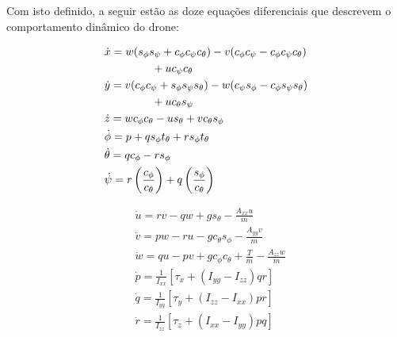 Com isto definido, a seguir estão as doze equações diferenciais que descrevem o comportamento dinâmico do drone:

\vspace{-0.2cm}

\begin{minipage}{0.5\textwidth}
    \begin{equation*}
        \begin{aligned}
            &\dot{{x}} = {w}({s_{\phi}s_{\psi}} + {c_{\phi}c_{\psi}c_{\theta}}) - {v}({c_{\phi}c_{\psi}} - {c_{\phi}c_{\psi}c_{\theta}}) \\
            &\hspace{1.5cm} + {uc_{\psi}c_{\theta}}\\
            &\dot{{y}} = {v}({c_{\phi}c_{\psi}} + {s_{\phi}s_{\psi}s_{\theta}}) - {w}({c_{\psi}s_{\phi}} - {c_{\phi}s_{\psi}s_{\theta}}) \\
            &\hspace{1.5cm} + {uc_{\theta}s_{\psi}}\\
            &\dot{{z}} = {wc_{\phi}c_{\theta}} - {us_{\theta}} + {vc_{\theta}s_{\phi}}\\
            &\dot{{\phi}} = {p} + {qs_{\phi}t_{\theta}} + {rs_{\phi}t_{\theta}}\\
            &\dot{{\theta}} = {qc_{\phi}} - {rs_{\phi}}\\
            &\dot{{\psi}} = {r\left(\frac{c_{\phi}}{c_{\theta}}\right)} + {q\left(\frac{s_{\phi}}{c_{\theta}}\right)}
        \end{aligned}
    \end{equation*}
\end{minipage}
\hfill
\begin{minipage}{0.45\textwidth}
    \begin{equation*}
        \begin{aligned}
            &\dot{{u}} = {rv} - {qw} + {gs_{\theta}} - \frac{{A_{xx}}{u}}{{m}}\\
            &\dot{{v}} = {pw} - {ru} - {gc_{\theta}s_{\phi}} - \frac{{A_{yy}}{v}}{{m}}\\
            &\dot{{w}} = {qu} - {pv} + {gc_{\phi}c_{\theta}} + {\frac{T}{m}} - \frac{{A_{zz}}{w}}{{m}}\\
            &\dot{{p}} = {\frac{1}{I_{xx}}\left[{\tau_x + (I_{yy} - I_{zz})qr}\right]}\\
            &\dot{{q}} = {\frac{1}{I_{yy}}\left[{\tau_y + (I_{zz} - I_{xx})pr}\right]}\\
            &\dot{{r}} = {\frac{1}{I_{zz}}\left[{\tau_z + (I_{xx} - I_{yy})pq}\right]}
        \end{aligned}
    \end{equation*}
\end{minipage}

